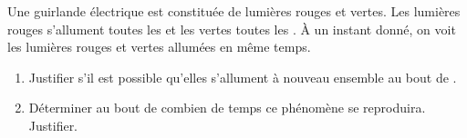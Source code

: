         Une guirlande électrique est constituée de lumières rouges et vertes.
        Les lumières rouges s'allument toutes les  et les vertes toutes les .
        À un instant donné, on voit les lumières rouges et vertes allumées en même temps.

        \begin{enumerate}
            \item Justifier s'il est possible qu'elles s'allument à nouveau ensemble au bout de .

            {}
            \item Déterminer au bout de combien de temps ce phénomène se reproduira. Justifier.


        \end{enumerate}
